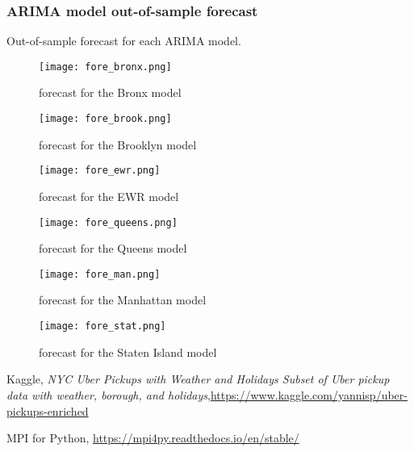 \documentclass[article, 10 pt, conference]{ieeeconf}
\begin{document}
\subsubsection{ARIMA model out-of-sample forecast}
\label{app:model_fore}
Out-of-sample forecast for each ARIMA model.
\begin{figure}[!htb]
    \texttt{[image: fore\_bronx.png]}
    \caption{forecast for the Bronx model}
\end{figure}
\begin{figure}[!htb]
    \texttt{[image: fore\_brook.png]}
    \caption{forecast for the Brooklyn model}
\end{figure}
\begin{figure}[!htb]
    \texttt{[image: fore\_ewr.png]}
    \caption{forecast for the EWR model}
\end{figure}
\begin{figure}[!htb]
    \texttt{[image: fore\_queens.png]}
    \caption{forecast for the Queens model}
\end{figure}
\begin{figure}[!htb]
    \texttt{[image: fore\_man.png]}
    \caption{forecast for the Manhattan model}
\end{figure}
\begin{figure}[!htb]
    \texttt{[image: fore\_stat.png]}
    \caption{forecast for the Staten Island model}
\end{figure}
\FloatBarrier


\addtolength{\textheight}{-12cm}   %

\clearpage
\begin{thebibliography}{99}

 Kaggle, \textit{NYC Uber Pickups with Weather and Holidays Subset of Uber pickup data with weather, borough, and holidays},\url{https://www.kaggle.com/yannisp/uber-pickups-enriched}

 MPI for Python, \url{https://mpi4py.readthedocs.io/en/stable/}

\end{thebibliography}
\end{document}
